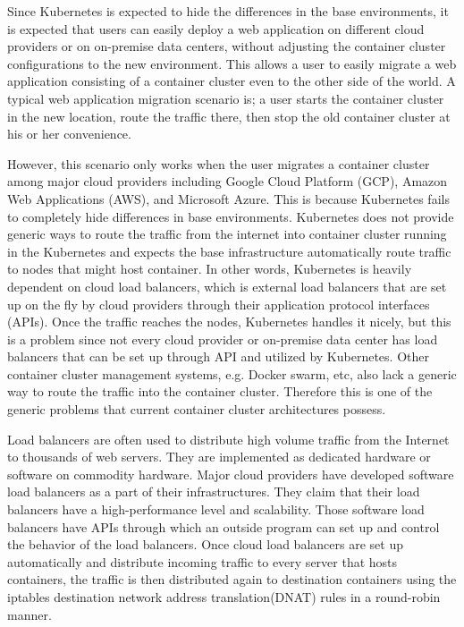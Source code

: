 Since Kubernetes is expected to hide the differences in the base environments, it is expected that users can easily deploy a web application on different cloud providers or on on-premise data centers, without adjusting the container cluster configurations to the new environment. 
This allows a user to easily migrate a web application consisting of a container cluster even to the other side of the world.
A typical web application migration scenario is; 
a user starts the container cluster in the new location, route the traffic there, then stop the old container cluster at his or her convenience.

However, this scenario only works when the user migrates a container cluster among major cloud providers including Google Cloud Platform (GCP), Amazon Web Applications (AWS), and Microsoft Azure.
This is because Kubernetes fails to completely hide differences in base environments.
Kubernetes does not provide generic ways to route the traffic from the internet into container cluster running in the Kubernetes and expects the base infrastructure automatically route traffic to nodes that might host container.
In other words, Kubernetes is heavily dependent on cloud load balancers, which is external load balancers that are set up on the fly by cloud providers through their application protocol interfaces (APIs).
Once the traffic reaches the nodes, Kubernetes handles it nicely, but this is a problem since not every cloud provider or on-premise data center has load balancers that can be set up through API and utilized by Kubernetes.
Other container cluster management systems, e.g. Docker swarm, etc, also lack a generic way to route the traffic into the container cluster.
Therefore this is one of the generic problems that current container cluster architectures possess.

Load balancers are often used to distribute high volume traffic from the Internet to thousands of web servers.
They are implemented as dedicated hardware or software on commodity hardware.
Major cloud providers have developed software load balancers\cite{eisenbud2016maglev,patel2013ananta} as a part of their infrastructures.
They claim that their load balancers have a high-performance level and scalability.
Those software load balancers have APIs through which an outside program can set up and control the behavior of the load balancers.
Once cloud load balancers are set up automatically and distribute incoming traffic to every server that hosts containers,
the traffic is then distributed again to destination containers using the iptables destination network address translation(DNAT)\cite{MartinA.Brown2017,Marmol2015} rules in a round-robin manner.

